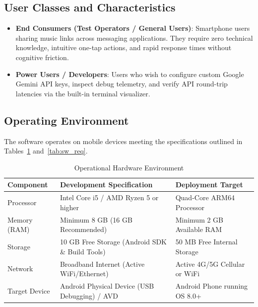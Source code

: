 \documentclass[12pt,a4paper]{report}
\begin{document}
\subsection{User Classes and Characteristics}
\begin{itemize}
    \item \textbf{End Consumers (Test Operators / General Users)}: Smartphone users sharing music links across messaging applications. They require zero technical knowledge, intuitive one-tap actions, and rapid response times without cognitive friction.
    \item \textbf{Power Users / Developers}: Users who wish to configure custom Google Gemini API keys, inspect debug telemetry, and verify API round-trip latencies via the built-in terminal visualizer.
\end{itemize}

\subsection{Operating Environment}
The software operates on mobile devices meeting the specifications outlined in Tables~\ref{tab:hw_req} and~\ref{tab:sw_req}.

\begin{table}[H]
\centering
\caption{Operational Hardware Environment}
\label{tab:hw_req}
\begin{tabularx}{\textwidth}{lXX}
\toprule
\textbf{Component} & \textbf{Development Specification} & \textbf{Deployment Target} \\
\midrule
Processor & Intel Core i5 / AMD Ryzen 5 or higher & Quad-Core ARM64 Processor \\
Memory (RAM) & Minimum 8 GB (16 GB Recommended) & Minimum 2 GB Available RAM \\
Storage & 10 GB Free Storage (Android SDK \& Build Tools) & 50 MB Free Internal Storage \\
Network & Broadband Internet (Active WiFi/Ethernet) & Active 4G/5G Cellular or WiFi \\
Target Device & Android Physical Device (USB Debugging) / AVD & Android Phone running OS 8.0+ \\
\bottomrule
\end{tabularx}
\end{table}
\end{document}

